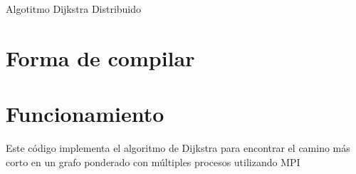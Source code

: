 \documentclass[a4paper,12pt]{article}
\begin{document}

\newpage



\newpage

\begin{center}
    {\Large Algotitmo Dijkstra Distribuido}
\end{center}

\section*{Forma de compilar}

\section*{Funcionamiento}

Este código implementa el algoritmo de Dijkstra para encontrar el camino más corto en un grafo ponderado con múltiples procesos utilizando MPI
\end{document}
